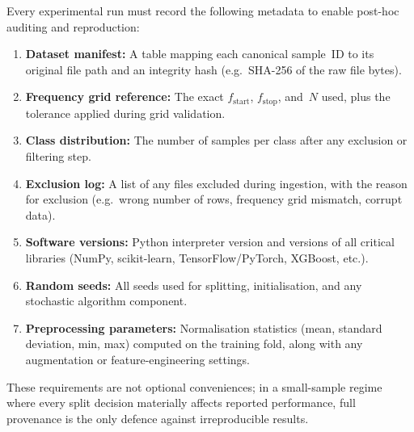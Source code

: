 Every experimental run must record the following metadata to enable
post-hoc auditing and reproduction:

\begin{enumerate}
    \item \textbf{Dataset manifest:}  A table mapping each canonical
        sample~ID to its original file path and an integrity hash
        (e.g.\ SHA-256 of the raw file bytes).
    \item \textbf{Frequency grid reference:}  The exact $f_{\text{start}}$,
        $f_{\text{stop}}$, and~$N$ used, plus the tolerance applied
        during grid validation.
    \item \textbf{Class distribution:}  The number of samples per class
        after any exclusion or filtering step.
    \item \textbf{Exclusion log:}  A list of any files excluded during
        ingestion, with the reason for exclusion (e.g.\ wrong number of
        rows, frequency grid mismatch, corrupt data).
    \item \textbf{Software versions:}  Python interpreter version and
        versions of all critical libraries (NumPy, scikit-learn,
        TensorFlow/PyTorch, XGBoost, etc.).
    \item \textbf{Random seeds:}  All seeds used for splitting,
        initialisation, and any stochastic algorithm component.
    \item \textbf{Preprocessing parameters:}  Normalisation statistics
        (mean, standard deviation, min, max) computed on the training
        fold, along with any augmentation or feature-engineering
        settings.
\end{enumerate}

\noindent
These requirements are not optional conveniences; in a small-sample
regime where every split decision materially affects reported
performance, full provenance is the only defence against irreproducible
results.
